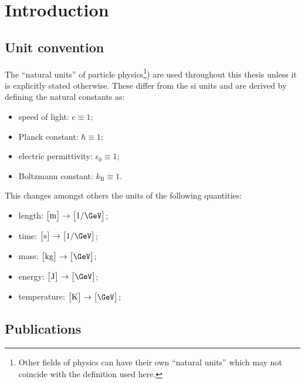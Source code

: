 \chapter{Introduction}

\section{Unit convention}

The ``natural units'' of particle physics\footnote{Other fields of physics can have their own ``natural units'' which may not coincide with the definition used here.}) are used throughout this thesis unless it is explicitly stated otherwise. These differ from the \gls{si} units and are derived by defining the natural constants as:

\begin{itemize}
\item speed of light: $\mathrm{c}\equiv 1$;
\item Planck constant: $\hbar\equiv 1$;
\item electric permittivity: $\epsilon_{0}\equiv 1$;
\item Boltzmann constant: $k_\mathrm{B}\equiv 1$.
\end{itemize}

This changes amongst others the units of the following quantities:

\begin{itemize}
\item length: $\big[\mathrm{m}\big]\rightarrow \big[1/\GeV\big]$;
\item time: $\big[\mathrm{s}\big]\rightarrow \big[1/\GeV\big]$;
\item mass: $\big[\mathrm{kg}\big]\rightarrow \big[\GeV\big]$;
\item energy: $\big[\mathrm{J}\big]\rightarrow \big[\GeV\big]$;
\item temperature: $\big[\mathrm{K}\big]\rightarrow \big[\GeV\big]$;
\end{itemize}


\section{Publications}

